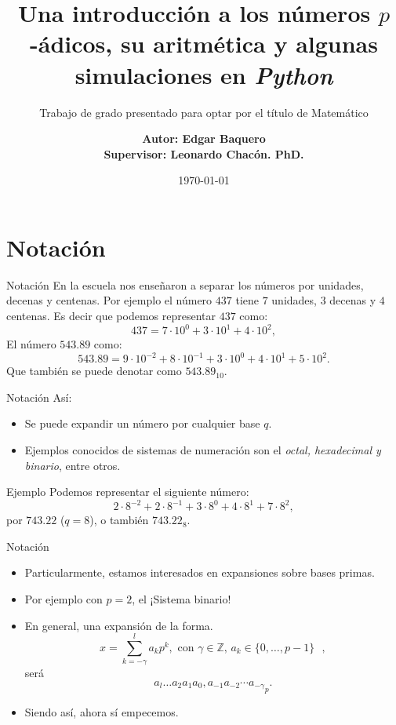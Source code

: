 \documentclass{beamer}
\title{Una introducción a los números $p$-ádicos, su aritmética y algunas simulaciones en \textit{Python}}
\subtitle{Trabajo de grado presentado para optar por el título de
Matemático}
\date{\today}
\author{\bf{Autor: }Edgar Baquero 
	\\ \bf{Supervisor: }Leonardo Chacón. PhD.}
\institute{Pontificia Universidad Javeriana,
Facultad de Ciencias\\
Departamento de Matemáticas}
\theoremstyle{definition}
\numberwithin{equation}{section}
\newcommand{\tit}[1]{\textit{#1}}
\newcommand{\Z}{\mathbb{Z}}
\begin{document}
  \maketitle
  \section{Notación}
  \begin{frame}{Notación}
    En la escuela nos enseñaron a separar los números por unidades, decenas y centenas. Por ejemplo el número $437$ tiene $7$ unidades, $3$ decenas y $4$ centenas. Es decir que podemos representar $437$ como:
    $$437 = 7\cdot10^0+ 3\cdot 10^1 + 4\cdot 10^2,$$
    El número $543.89$ como:
    $$543.89 = 9\cdot10^{-2}+8\cdot10^{-1}+3\cdot10^0+4\cdot10^1+5\cdot10^2.$$
    Que también se puede denotar como $543.89_{10}$.
  \end{frame}

  \begin{frame}{Notación}
  	Así:
  	\begin{itemize}
  		\item Se puede expandir un número por cualquier base $q$.
 		\item Ejemplos conocidos de sistemas de numeración son el \tit{octal, hexadecimal y binario}, entre otros.
  	\end{itemize}
  \begin{exampleblock}{Ejemplo}
	Podemos representar el siguiente número:
	$$2\cdot8^{-2}+2\cdot8^{-1}+3\cdot8^0+4\cdot8^1+7\cdot8^2,$$
	por $743.22$ ($q=8$), o también $743.22_8$.
  \end{exampleblock}
	 
  \end{frame}

\begin{frame}{Notación}
	\begin{itemize}
		\item Particularmente, estamos interesados en expansiones sobre bases primas.
		\item Por ejemplo con $p=2$, el ¡Sistema binario!
		\item En general, una expansión de la forma.	$$x=\sum_{k=-\gamma}^{l}a_kp^k,\text{ con $\gamma\in\Z$, $a_k\in \{0,\dots,p-1\}$ },$$
		será
		\begin{equation}\label{notacion}
		{a_{l} \ldots a_{2} a_{1} a_{0},a_{-1}a_{-2}\cdots a_{-\gamma}}_p.
		\end{equation}
		\item Siendo así, ahora sí empecemos.
	\end{itemize}

\end{frame}
\end{document}
